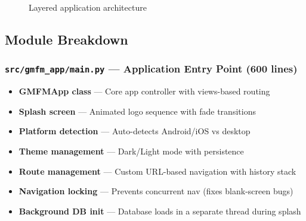 \documentclass[12pt,a4paper]{article}
\begin{document}
\begin{figure}[H]
\caption{Layered application architecture}
\end{figure}

\subsection{Module Breakdown}

\subsubsection{\texttt{src/gmfm\_app/main.py} --- Application Entry Point (600 lines)}

\begin{itemize}[leftmargin=2em]
    \item \textbf{GMFMApp class} --- Core app controller with views-based routing
    \item \textbf{Splash screen} --- Animated logo sequence with fade transitions
    \item \textbf{Platform detection} --- Auto-detects Android/iOS vs desktop
    \item \textbf{Theme management} --- Dark/Light mode with persistence
    \item \textbf{Route management} --- Custom URL-based navigation with history stack
    \item \textbf{Navigation locking} --- Prevents concurrent nav (fixes blank-screen bugs)
    \item \textbf{Background DB init} --- Database loads in a separate thread during splash
\end{itemize}
\end{document}
